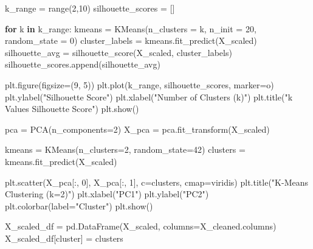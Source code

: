 \documentclass[
  11pt,
  letterpaper,
  DIV=11,
  numbers=noendperiod]{scrartcl}
\newenvironment{Shaded}{\begin{snugshade}}{\end{snugshade}}
\newcommand{\BuiltInTok}[1]{\textcolor[rgb]{0.00,0.23,0.31}{#1}}
\newcommand{\ControlFlowTok}[1]{\textcolor[rgb]{0.00,0.23,0.31}{\textbf{#1}}}
\newcommand{\DecValTok}[1]{\textcolor[rgb]{0.68,0.00,0.00}{#1}}
\newcommand{\KeywordTok}[1]{\textcolor[rgb]{0.00,0.23,0.31}{\textbf{#1}}}
\newcommand{\NormalTok}[1]{\textcolor[rgb]{0.00,0.23,0.31}{#1}}
\newcommand{\OperatorTok}[1]{\textcolor[rgb]{0.37,0.37,0.37}{#1}}
\newcommand{\StringTok}[1]{\textcolor[rgb]{0.13,0.47,0.30}{#1}}
\begin{document}
\begin{Shaded}
\begin{Highlighting}[]
\NormalTok{k\_range }\OperatorTok{=} \BuiltInTok{range}\NormalTok{(}\DecValTok{2}\NormalTok{,}\DecValTok{10}\NormalTok{)}
\NormalTok{silhouette\_scores }\OperatorTok{=}\NormalTok{ []}

\ControlFlowTok{for}\NormalTok{ k }\KeywordTok{in}\NormalTok{ k\_range:}
\NormalTok{    kmeans }\OperatorTok{=}\NormalTok{ KMeans(n\_clusters }\OperatorTok{=}\NormalTok{ k, n\_init }\OperatorTok{=} \DecValTok{20}\NormalTok{, random\_state }\OperatorTok{=} \DecValTok{0}\NormalTok{)}
\NormalTok{    cluster\_labels }\OperatorTok{=}\NormalTok{ kmeans.fit\_predict(X\_scaled)}
\NormalTok{    silhouette\_avg }\OperatorTok{=}\NormalTok{ silhouette\_score(X\_scaled, cluster\_labels)}
\NormalTok{    silhouette\_scores.append(silhouette\_avg)}

\NormalTok{plt.figure(figsize}\OperatorTok{=}\NormalTok{(}\DecValTok{9}\NormalTok{, }\DecValTok{5}\NormalTok{))}
\NormalTok{plt.plot(k\_range, silhouette\_scores, marker}\OperatorTok{=}\StringTok{\textquotesingle{}o\textquotesingle{}}\NormalTok{)}
\NormalTok{plt.ylabel(}\StringTok{"Silhouette Score"}\NormalTok{)}
\NormalTok{plt.xlabel(}\StringTok{"Number of Clusters (k)"}\NormalTok{)}
\NormalTok{plt.title(}\StringTok{"k Values Silhouette Score"}\NormalTok{)}
\NormalTok{plt.show()}
\end{Highlighting}
\end{Shaded}

\begin{Shaded}
\begin{Highlighting}[]
\NormalTok{pca }\OperatorTok{=}\NormalTok{ PCA(n\_components}\OperatorTok{=}\DecValTok{2}\NormalTok{)}
\NormalTok{X\_pca }\OperatorTok{=}\NormalTok{ pca.fit\_transform(X\_scaled)}

\NormalTok{kmeans }\OperatorTok{=}\NormalTok{ KMeans(n\_clusters}\OperatorTok{=}\DecValTok{2}\NormalTok{, random\_state}\OperatorTok{=}\DecValTok{42}\NormalTok{)}
\NormalTok{clusters }\OperatorTok{=}\NormalTok{ kmeans.fit\_predict(X\_scaled)}

\NormalTok{plt.scatter(X\_pca[:, }\DecValTok{0}\NormalTok{], X\_pca[:, }\DecValTok{1}\NormalTok{], c}\OperatorTok{=}\NormalTok{clusters, cmap}\OperatorTok{=}\StringTok{\textquotesingle{}viridis\textquotesingle{}}\NormalTok{)}
\NormalTok{plt.title(}\StringTok{"K{-}Means Clustering (k=2)"}\NormalTok{)}
\NormalTok{plt.xlabel(}\StringTok{"PC1"}\NormalTok{)}
\NormalTok{plt.ylabel(}\StringTok{"PC2"}\NormalTok{)}
\NormalTok{plt.colorbar(label}\OperatorTok{=}\StringTok{"Cluster"}\NormalTok{)}
\NormalTok{plt.show()}

\NormalTok{X\_scaled\_df }\OperatorTok{=}\NormalTok{ pd.DataFrame(X\_scaled, columns}\OperatorTok{=}\NormalTok{X\_cleaned.columns)}
\NormalTok{X\_scaled\_df[}\StringTok{\textquotesingle{}cluster\textquotesingle{}}\NormalTok{] }\OperatorTok{=}\NormalTok{ clusters}
\end{Highlighting}
\end{Shaded}
\end{document}
